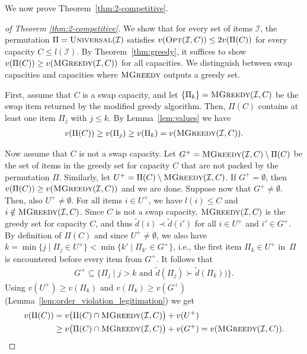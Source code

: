 \documentclass[11pt]{article}
\newcommand{\innerand}{\text{ and }}
\begin{document}
We now prove Theorem~\ref{thm:2-competitive}.
\begin{proof}
[of Theorem \ref{thm:2-competitive}] We show that for every set of
items $\mathcal{I}$, the permutation $\Pi=\textsc{Universal}(\mathcal{I})$
satisfies $v(\textsc{Opt}(\mathcal{I},C))\leq2v(\Pi(C))$ for every
capacity $C\leq l(\mathcal{I})$. By Theorem~\ref{thm:greedy}, it
suffices to show $v(\Pi(C))\geq v(\textsc{MGreedy}(\mathcal{I},C))$
for all capacities. We distinguish between swap capacities and capacities
where $\textsc{MGreedy}$ outputs a greedy set.

First, assume that $C$ is a swap capacity, and let $\{\Pi_{k}\}=\textsc{MGreedy}(\mathcal{I},C)$
be the swap item returned by the modified greedy algorithm. Then,
$\Pi(C)$ contains at least one item $\Pi_{j}$ with $j\leq k$. By
Lemma~\ref{lem:values} we have 
\begin{align*}
v(\Pi(C))\geq v(\Pi_{j})\geq v(\Pi_{k})=v(\textsc{MGreedy}(\mathcal{I},C)).
\end{align*}


Now assume that $C$ is not a swap capacity. Let $G^{+}=\textsc{MGreedy}(\mathcal{I},C)\setminus\Pi(C)$
be the set of items in the greedy set for capacity $C$ that are not
packed by the permutation $\Pi$. Similarly, let $U^{+}=\Pi(C)\setminus\textsc{MGreedy}(\mathcal{I},C)$.
If $G^{+}=\emptyset$, then $v(\Pi(C))\geq v(\textsc{MGreedy}(\mathcal{I},C))$
and we are done. Suppose now that $G^{+}\neq\emptyset$. Then, also
$U^{+}\neq\emptyset$. For all items $i\in U^{+}$, we have $l(i)\leq C$
and $i\notin\textsc{MGreedy}(\mathcal{I},C)$. Since $C$ is not a
swap capacity, $\textsc{MGreedy}(\mathcal{I},C)$ is the greedy set
for capacity $C$, and thus $\tilde{d}(i)\prec\tilde{d}(i')$ for
all $i\in U^{+}$ and $i'\in G^{+}$. By definition of $\Pi(C)$ and
since $U^{+}\neq\emptyset$, we also have $k=\min\{j\mid\Pi_{j}\in U^{+}\}<\min\{k'\mid\Pi_{k'}\in G^{+}\}$,
i.e., the first item $\Pi_{k}\in U^{+}$ in~$\Pi$ is encountered
before every item from $G^{+}$. It follows that 
\begin{align*}
G^{+}\subseteq\bigl\{\Pi_{j}\mid j>k\innerand\tilde{d}(\Pi_{j})\succ\tilde{d}(\Pi_{k})\bigr)\bigr\}.
\end{align*}
 Using $v(U^{+})\geq v(\Pi_{k})$ and $v(\Pi_{k})\geq v(G^{+})$ (Lemma~\ref{lem:order_violation_legitimation})
we get 
\begin{align*}
v(\Pi(C)) & =v\bigl(\Pi(C)\cap\textsc{MGreedy}(\mathcal{I},C)\bigr)+v(U^{+})\\
 & \geq v\bigl(\Pi(C)\cap\textsc{MGreedy}(\mathcal{I},C)\bigr)+v(G^{+})=v(\textsc{MGreedy}(\mathcal{I},C)).
\end{align*}
\end{proof}
\end{document}
